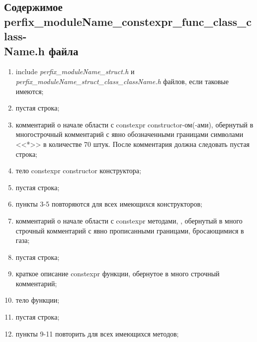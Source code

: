 \subsection{Содержимое perfix\-\_moduleName\-\_constexpr\-\_func\-\_class\-\_class-\\\-Name.h файла}\label{p:conf:ch}
\begin{enumerate}
	\item include \textit{perfix\_moduleName\_struct.h} и \textit{perfix\_moduleName\_struct\_class\_className.h} файлов, если таковые имеются;
	\item пустая строка;
	\item комментарий о начале области с constexpr constructor-ом(-ами), обернутый в многострочный комментарий с явно обозначенными границами символами <<*>> в количестве 70 штук. После комментария должна следовать  пустая строка;
	\item тело constexpr constructor конструктора;
	\item пустая строка;
	\item пункты 3-5 повторяются для всех имеющихся конструкторов;
	\item комментарий о начале области с constexpr методами, , обернутый в много строчный комментарий с явно прописанными границами, бросающимися в газа;
	\item пустая строка;
	\item краткое описание constexpr функции, обернутое в много строчный комментарий;
	\item тело функции;
	\item пустая строка;
	\item пункты 9-11 повторить для всех имеющихся методов;
	
\end{enumerate}

